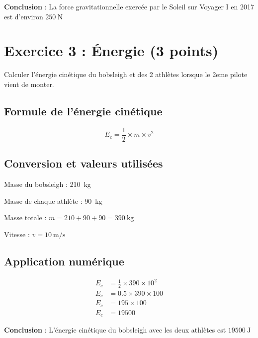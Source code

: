 \documentclass[answers]{exam}
\begin{document}
\begin{questions}
\begin{parts}
\begin{solution}
      \textbf{Conclusion} : La force gravitationnelle exercée par le Soleil sur Voyager I en 2017 est d’environ \(\SI{250}{\newton}\)
      \end{solution}
    \end{parts}
\end{questions}


\section*{Exercice 3 : Énergie (3 points)}

\begin{questions}

\question[1.5] Calculer l'énergie cinétique du bobsleigh et des 2 athlètes lorsque le 2eme pilote vient de monter.

\begin{solution}

\subsection*{Formule de l'énergie cinétique}
\[
E_c = \frac{1}{2} \times m \times v^2
\]

\subsection*{Conversion et valeurs utilisées}
\begin{compactitem}
  \item Masse du bobsleigh : \SI{210}{\kilogram}
  \item Masse de chaque athlète : \SI{90}{\kilogram}
  \item Masse totale : \( m = 210 + 90 + 90 = \SI{390}{\kilogram} \)
  \item Vitesse : \( v = \SI{10}{\meter\per\second} \)
\end{compactitem}

\subsection*{Application numérique}
\begin{align*}
E_c &= \frac{1}{2} \times 390 \times 10^2 \\
E_c &= 0.5 \times 390 \times 100 \\
E_c &= 195 \times 100 \\
E_c &= 19500
\end{align*}

\textbf{Conclusion} : L'énergie cinétique du bobsleigh avec les deux athlètes est \(\SI{19500}{\joule}\)


\end{solution}
\end{questions}
\end{document}

